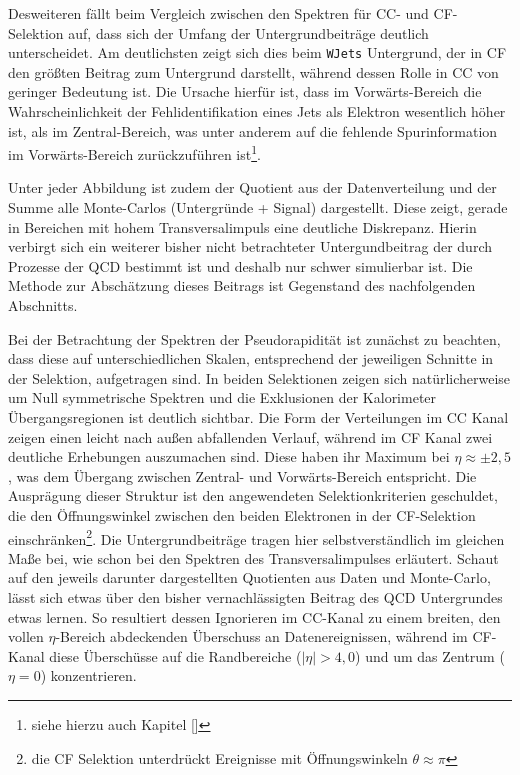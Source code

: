 Desweiteren fällt beim Vergleich zwischen den Spektren für \ac{CC}- und
\ac{CF}-Selektion auf, dass sich der Umfang der Untergrundbeiträge deutlich 
unterscheidet. Am deutlichsten zeigt sich dies beim \texttt{WJets}
Untergrund, der in \ac{CF} den größten Beitrag zum Untergrund darstellt,
während dessen Rolle in \ac{CC} von geringer Bedeutung ist. Die Ursache
hierfür ist, dass im Vorwärts-Bereich die Wahrscheinlichkeit der
Fehlidentifikation eines Jets als Elektron wesentlich höher ist, als im
Zentral-Bereich, was unter anderem auf die fehlende Spurinformation im
Vorwärts-Bereich zurückzuführen ist\footnote{siehe hierzu auch Kapitel \ref{}}.

Unter jeder Abbildung ist zudem der Quotient aus der Datenverteilung und der
Summe alle Monte-Carlos (Untergründe + Signal) dargestellt. Diese zeigt, gerade
in Bereichen mit hohem Transversalimpuls eine deutliche Diskrepanz. Hierin
verbirgt sich ein weiterer bisher nicht betrachteter Untergundbeitrag der durch
Prozesse der \ac{QCD} bestimmt ist und deshalb nur schwer simulierbar ist. Die
Methode zur Abschätzung dieses Beitrags ist Gegenstand des nachfolgenden
Abschnitts.

Bei der Betrachtung der Spektren der Pseudorapidität ist zunächst zu beachten,
dass diese auf unterschiedlichen Skalen, entsprechend der jeweiligen Schnitte
in der Selektion, aufgetragen sind. In beiden Selektionen zeigen sich
natürlicherweise um Null symmetrische Spektren und die Exklusionen der
Kalorimeter Übergangsregionen ist deutlich sichtbar. Die Form der Verteilungen
im \ac{CC} Kanal zeigen einen leicht nach außen abfallenden Verlauf, während im
\ac{CF} Kanal zwei deutliche Erhebungen auszumachen sind. Diese haben ihr
Maximum bei $\eta\approx\pm 2,5$, was dem Übergang zwischen Zentral- und
Vorwärts-Bereich entspricht. Die Ausprägung dieser Struktur ist den
angewendeten Selektionkriterien geschuldet, die den Öffnungswinkel
zwischen den beiden Elektronen in der \ac{CF}-Selektion
einschränken\footnote{die \ac{CF} Selektion unterdrückt Ereignisse mit
Öffnungswinkeln $\theta \approx \pi$}. Die Untergrundbeiträge tragen hier
selbstverständlich im gleichen Maße bei, wie schon bei den Spektren des
Transversalimpulses erläutert. Schaut auf den jeweils darunter dargestellten
Quotienten aus Daten und Monte-Carlo, lässt sich etwas über den bisher
vernachlässigten Beitrag des \ac{QCD} Untergrundes etwas lernen. So resultiert
dessen Ignorieren im \ac{CC}-Kanal zu einem breiten, den vollen $\eta$-Bereich
abdeckenden Überschuss an Datenereignissen, während im \ac{CF}-Kanal diese
Überschüsse auf die Randbereiche ($|\eta| > 4,0$) und um das Zentrum ($\eta=0$)
konzentrieren.



